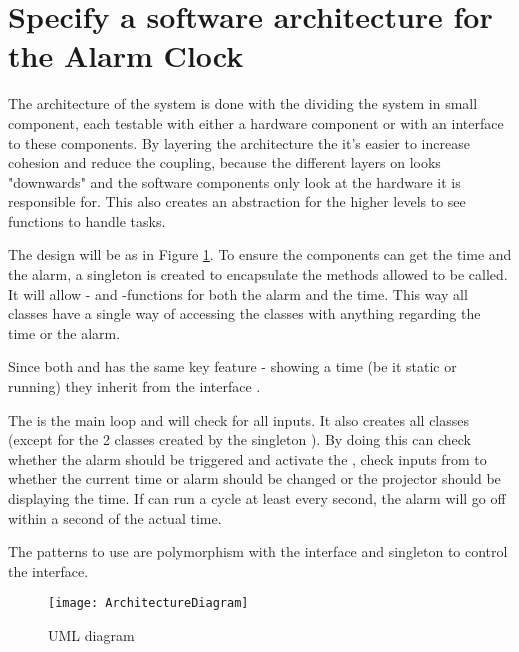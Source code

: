 \documentclass[Main_Assignment3]{subfiles}
\begin{document}
\section{Specify a software architecture for the Alarm Clock}

The architecture of the system is done with the dividing the system in small component, each testable with either a hardware component or with an interface to these components.
By layering the architecture the it's easier to increase cohesion and reduce the coupling, because the different layers on looks "downwards" and the software components only look at the hardware it is responsible for.
This also creates an abstraction for the higher levels to see functions to handle tasks.

The design will be as in Figure \ref{fig:UML}.
To ensure the components can get the time and the alarm, a singleton is created to encapsulate the methods allowed to be called. 
It will allow - and -functions for both the alarm and the time. This way all classes have a single way of accessing the classes with anything regarding the time or the alarm.

Since both  and  has the same key feature - showing a time (be it static or running) they inherit from the interface .

The  is the main loop and will check for all inputs.
It also creates all classes (except for the 2  classes created by the singleton ). 
By doing this  can check whether the alarm should be triggered and activate the , check inputs from  to whether the current time or alarm should be changed or the projector should be displaying the time.
If  can run a cycle at least every second, the alarm will go off within a second of the actual time.

The patterns to use are polymorphism with the interface and singleton to control the interface.

\begin{figure}[hbtp]
\centering
\texttt{[image: ArchitectureDiagram]}
\caption{UML diagram}
\label{fig:UML}
\end{figure}
\end{document}
